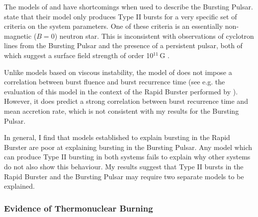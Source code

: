 \par The models of \citet{Spruit_Type2Mod} and \citet{Walker_Type2Mod} have shortcomings when used to describe the Bursting Pulsar.  \citet{Walker_Type2Mod} state that their model only produces Type II bursts for a very specific set of criteria on the system parameters.   One of these criteria is an essentially non-magnetic ($B=0$) neutron star.  This is inconsistent with observations of cyclotron lines from the Bursting Pulsar and the presence of a persistent pulsar, both of which suggest a surface field strength of order 10$^{11}$\,G \citep{Doroshenko_NBFlash}.
\par Unlike models based on viscous instability, the model of \citet{Spruit_Type2Mod} does not impose a correlation between burst fluence and burst recurrence time (see e.g. the evaluation of this model in the context of the Rapid Burster performed by \citealp{Bagnoli_PopStudy}).  However, it does predict a strong correlation between burst recurrence time and mean accretion rate, which is not consistent with my results for the Bursting Pulsar.
\par In general, I find that models established to explain bursting in the Rapid Burster are poor at explaining bursting in the Bursting Pulsar.  Any model which can produce Type II bursting in both systems fails to explain why other systems do not also show this behaviour.  My results suggest that Type II bursts in the Rapid Burster and the Bursting Pulsar may require two separate models to be explained.

\subsubsection{Evidence of Thermonuclear Burning}

\label{sec:nuc}

